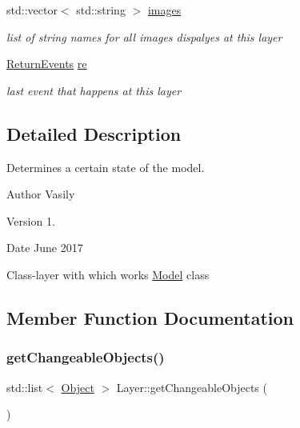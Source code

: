 \begin{DoxyCompactItemize}
std\+::vector$<$ std\+::string $>$ \hyperlink{class_layer_a0bfe2f79d24415f8619a4a7491bf1fd8}{images}
\begin{DoxyCompactList}\small\item\em list of string names for all images dispalyes at this layer \end{DoxyCompactList}\item 
\mbox{\label{class_layer_a157765c60d80f37a81c5f317da6495fe}} 
\hyperlink{_events_8h_a51620cf702f1b8fdf47cd0a5cfa0ba4f}{Return\+Events} \hyperlink{class_layer_a157765c60d80f37a81c5f317da6495fe}{re}
\begin{DoxyCompactList}\small\item\em last event that happens at this layer \end{DoxyCompactList}\end{DoxyCompactItemize}


\subsection{Detailed Description}
Determines a certain state of the model. 

\begin{DoxyAuthor}{Author}
Vasily 
\end{DoxyAuthor}
\begin{DoxyVersion}{Version}
1. 
\end{DoxyVersion}
\begin{DoxyDate}{Date}
June 2017
\end{DoxyDate}
Class-\/layer with which works \hyperlink{class_model}{Model} class 

\subsection{Member Function Documentation}
\mbox{\label{class_layer_af1303bfbd28803f32708729f54ca13ec}} 
\subsubsection{\texorpdfstring{get\+Changeable\+Objects()}{getChangeableObjects()}}
{\footnotesize\ttfamily std\+::list$<$ \hyperlink{class_object}{Object} $>$ Layer\+::get\+Changeable\+Objects (\begin{DoxyParamCaption}{ }\end{DoxyParamCaption})}

